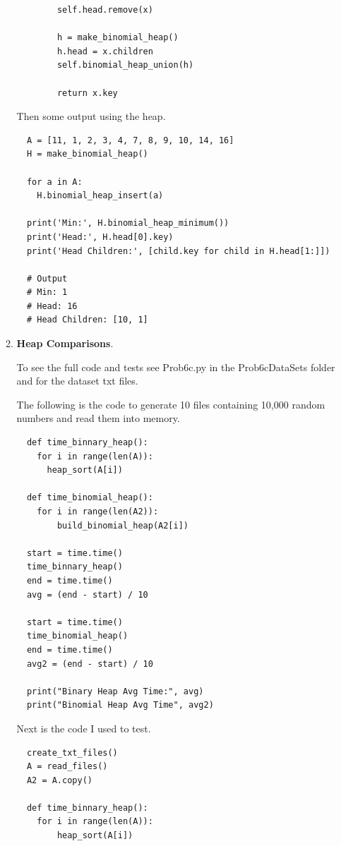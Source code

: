 \documentclass{article}
\begin{document}
\begin{enumerate}
\begin{enumerate}
\begin{lstlisting}
        self.head.remove(x)
        
        h = make_binomial_heap()
        h.head = x.children
        self.binomial_heap_union(h)

        return x.key      
    \end{lstlisting}

    Then some output using the heap.

    \begin{lstlisting}
  A = [11, 1, 2, 3, 4, 7, 8, 9, 10, 14, 16]
  H = make_binomial_heap()

  for a in A:
    H.binomial_heap_insert(a)

  print('Min:', H.binomial_heap_minimum())
  print('Head:', H.head[0].key)
  print('Head Children:', [child.key for child in H.head[1:]])

  # Output 
  # Min: 1
  # Head: 16
  # Head Children: [10, 1]
    \end{lstlisting}

    \item \textbf{Heap Comparisons}.

    To see the full code and tests see Prob6c.py in the Prob6cDataSets folder and for the dataset txt files.

    The following is the code to generate 10 files containing 10,000 random numbers and read them into memory.

    \begin{lstlisting}
  def time_binnary_heap():
    for i in range(len(A)):
      heap_sort(A[i])

  def time_binomial_heap():
    for i in range(len(A2)):
        build_binomial_heap(A2[i])

  start = time.time()
  time_binnary_heap()
  end = time.time()                   
  avg = (end - start) / 10
                    
  start = time.time()
  time_binomial_heap()
  end = time.time()                   
  avg2 = (end - start) / 10
      
  print("Binary Heap Avg Time:", avg)    
  print("Binomial Heap Avg Time", avg2)
    \end{lstlisting}

    Next is the code I used to test.

    \begin{lstlisting}
  create_txt_files()
  A = read_files()
  A2 = A.copy()

  def time_binnary_heap():
    for i in range(len(A)):
        heap_sort(A[i])


\end{lstlisting}
\end{enumerate}
\end{enumerate}
\end{document}
